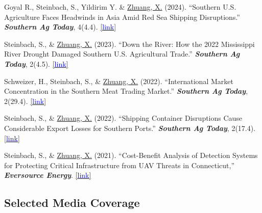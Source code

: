 \documentclass[10.5 pt,letterpaper]{article}
\renewenvironment{itemize}{
	\begin{list}{}{
			\setlength{\leftmargin}{1.5em}
		}
	}{
	\end{list}
}
\begin{document}
\begin{itemize}
	
	\item[-]  Goyal R., Steinbach, S., Yildirim Y. \& \underline{Zhuang, X.} (2024). ``Southern U.S. Agriculture Faces Headwinds in Asia Amid Red Sea Shipping Disruptions.'' \textit{\textbf{Southern Ag Today}}, 4(4.4).
\href{https://southernagtoday.org/2024/01/25/southern-u-s-agriculture-faces-headwinds-in-asia-amid-red-sea-shipping-disruptions/}{[{\underline{\textcolor{blue}{link}}}]} 



	
	\item[-] Steinbach, S., \& \underline{Zhuang, X.} (2023). ``Down the River: How the 2022 Mississippi River Drought Damaged Southern U.S. Agricultural Trade.'' \textit{\textbf{Southern Ag Today}}, 2(4.5).
	\href{https://southernagtoday.org/2023/05/04/down-the-river-how-the-2022-mississippi-river-drought-damaged/}{[{\underline{\textcolor{blue}{link}}}]} 
	
	\item[-] Schweizer, H., Steinbach, S., \& \underline{Zhuang, X.} (2022). ``International Market Concentration in the Southern Meat Trading Market.'' \textit{\textbf{Southern Ag Today}}, 2(29.4).
	\href{https://southernagtoday.org/2022/07/international-market-concentration-in-the-southern-meat-trading-market/}{[{\underline{\textcolor{blue}{link}}}]} 
	
	\item[-] Steinbach, S., \& \underline{Zhuang, X.} (2022). ``Shipping Container Disruptions Cause Considerable Export Losses for Southern Ports.'' \textit{\textbf{Southern Ag Today}}, 2(17.4).
	\href{https://southernagtoday.org/2022/04/shipping-container-disruptions-cause-considerable-export-losses-for-southern-ports/}{[{\underline{\textcolor{blue}{link}}}]} 
	
	\item[-] Steinbach, S., \& \underline{Zhuang, X.} (2021). ``Cost-Benefit Analysis of Detection Systems for Protecting Critical Infrastructure from UAV Threats in Connecticut,'' \textit{\textbf{Eversource Energy}}.
	\href{https://www.dropbox.com/s/hmnrb6rljgsyvei/UConn%20CBA%20Report%202021.pdf?dl=0}{[{\underline{\textcolor{blue}{link}}}]} 
	
	
\end{itemize}



 \subsection*{\textbf{Selected Media Coverage}}
 
\end{document}
